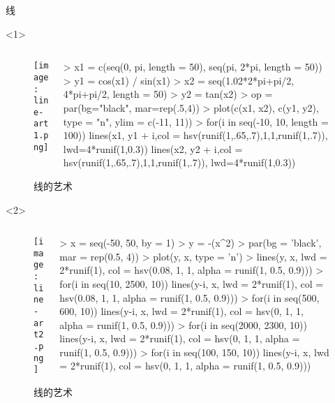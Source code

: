 \begin{frame}[c,fragile]{\subsecname}{线}
\begin{onlyenv}<1>
\begin{figure}
  \begin{columns}
    \begin{column}[c]{.4\textwidth}
        \texttt{[image: line-art1.png]}
    \end{column}

    \begin{column}[c]{.6\textwidth}
\begin{rcode}
> x1 = c(seq(0, pi, length = 50), seq(pi, 2*pi, length = 50))
> y1 = cos(x1) / sin(x1)
> x2 = seq(1.02*2*pi+pi/2, 4*pi+pi/2, length = 50)
> y2 = tan(x2)
> op = par(bg="black", mar=rep(.5,4))
> plot(c(x1, x2), c(y1, y2), type = "n", ylim = c(-11, 11))
> for(i in seq(-10, 10, length = 100)){
      lines(x1, y1 + i,col = hsv(runif(1,.65,.7),1,1,runif(1,.7)),
            lwd=4*runif(1,0.3))
      lines(x2, y2 + i,col = hsv(runif(1,.65,.7),1,1,runif(1,.7)),
            lwd=4*runif(1,0.3))
  }
\end{rcode}
    \end{column}
  \end{columns}
  \caption{线的艺术}
\end{figure}
\end{onlyenv} 

\begin{onlyenv}<2>
\begin{figure}
  \begin{columns}
    \begin{column}[c]{.4\textwidth}
        \texttt{[image: line-art2.png]}
    \end{column}

    \begin{column}[c]{.6\textwidth}
\begin{rcode}
> x = seq(-50, 50, by = 1)
> y = -(x^2)
> par(bg = 'black', mar = rep(0.5, 4))
> plot(y, x, type = 'n')
> lines(y, x, lwd = 2*runif(1), col = hsv(0.08, 1, 1, alpha = runif(1, 0.5, 0.9)))
> for(i in seq(10, 2500, 10)){
      lines(y-i, x, lwd = 2*runif(1), col = hsv(0.08, 1, 1, alpha = runif(1, 0.5, 0.9)))
  }
> for(i in seq(500, 600, 10)){
      lines(y-i, x, lwd = 2*runif(1), col = hsv(0, 1, 1, alpha = runif(1, 0.5, 0.9)))
  }
> for(i in seq(2000, 2300, 10)){
      lines(y-i, x, lwd = 2*runif(1), col = hsv(0, 1, 1, alpha = runif(1, 0.5, 0.9)))
  }
> for(i in seq(100, 150, 10)){
      lines(y-i, x, lwd = 2*runif(1), col = hsv(0, 1, 1, alpha = runif(1, 0.5, 0.9)))
  }
\end{rcode}
    \end{column}
  \end{columns}
  \caption{线的艺术}
\end{figure}
\end{onlyenv} 


\end{frame}
